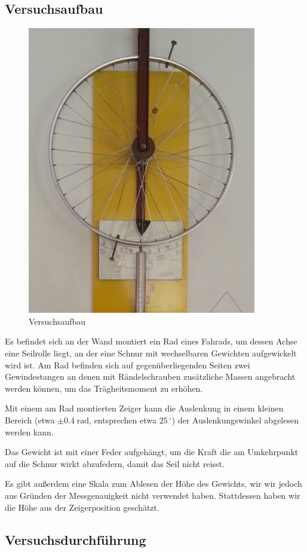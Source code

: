 \documentclass[a4paper,german,12pt,smallheadings]{scrartcl}
\begin{document}
\subsection{Versuchsaufbau}
\begin{figure}
  \includegraphics[width=10cm]{fig1.jpg}
  \caption{Versuchsaufbau}
\end{figure}
Es befindet sich an der Wand montiert ein Rad eines Fahrads, um dessen Achse
eine Seilrolle liegt, an der eine Schnur mit wechselbaren Gewichten
aufgewickelt wird ist. Am Rad befinden sich auf gegenüberliegenden Seiten zwei
Gewindestangen an denen mit Rändelschrauben zusätzliche Massen angebracht
werden können, um das Trägheitsmoment zu erhöhen.

Mit einem am Rad montierten Zeiger kann die Auslenkung in einem kleinen Bereich
(etwa $\pm 0.4\; \mathrm{rad}$, entsprechen etwa $25\,^\circ$) der
Auslenkungswinkel abgelesen werden kann.

Das Gewicht ist mit einer Feder aufgehängt, um die Kraft die am Umkehrpunkt auf
die Schnur wirkt abzufedern, damit das Seil nicht reisst.

Es gibt außerdem eine Skala zum Ablesen der Höhe des Gewichts, wir wir jedoch
aus Gründen der Messgenauigkeit nicht verwendet haben. Stattdessen haben wir
die Höhe aus der Zeigerposition geschätzt.

\subsection{Versuchsdurchführung}
\end{document}
